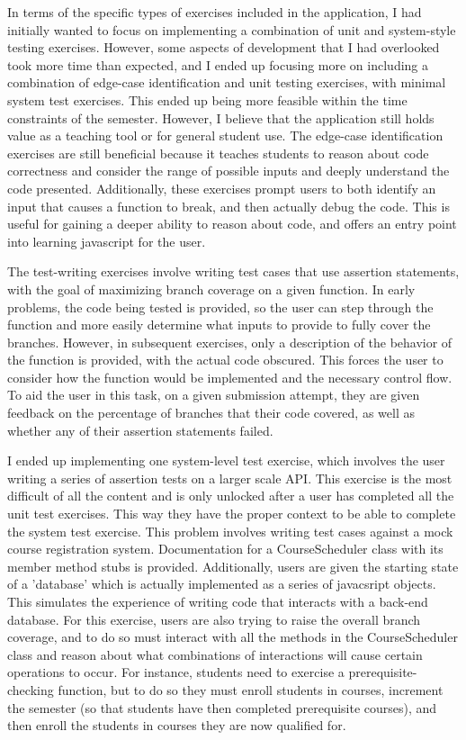 \documentclass[10pt,twocolumn]{article}
\begin{document}
In terms of the specific types of exercises included in the application, I had initially wanted to focus on implementing 
a combination of unit and system-style testing exercises. However, some aspects of development that I had overlooked took 
more time than expected, and I ended up focusing more on including a combination of edge-case identification and unit testing 
exercises, with minimal system test exercises. This ended up being more feasible within the time constraints of the semester. 
However, I believe that the application still holds value as a teaching tool or for general student use. The edge-case 
identification exercises are still beneficial because it teaches students to reason about code correctness and consider 
the range of possible inputs and deeply understand the code presented. Additionally, these exercises prompt users to both 
identify an input that causes a function to break, and then actually debug the code. This is useful for gaining a deeper 
ability to reason about code, and offers an entry point into learning javascript for the user. 

The test-writing exercises involve writing test cases that use assertion statements, with the goal of maximizing branch 
coverage on a given function. In early problems, the code being tested is provided, so the user can step 
through the function and more easily determine what inputs to provide to fully cover the branches. However, in subsequent 
exercises, only a description of the behavior of the function is provided, with the actual code obscured. This forces the 
user to consider how the function would be implemented and the necessary control flow. To aid the user in this 
task, on a given submission attempt, they are given feedback on the percentage of branches that their code covered, as 
well as whether any of their assertion statements failed.

I ended up implementing one system-level test exercise, which involves the user writing a series of assertion tests on a
larger scale API. This exercise is the most difficult of all the content and is only unlocked after a user has completed 
all the unit test exercises. This way they have the proper context to be able to complete the system test exercise. This
problem involves writing test cases against a mock course registration system. Documentation 
for a CourseScheduler class with its member method stubs is provided. Additionally, users are given the starting state of a 'database' 
which is actually implemented as a series of javacsript objects. This simulates the experience of writing code 
that interacts with a back-end database. For this exercise, users are also trying to raise the overall branch coverage, 
and to do so must interact with all the methods in the CourseScheduler class and reason about what combinations of 
interactions will cause certain operations to occur. For instance, students need to exercise a prerequisite-checking function,
but to do so they must enroll students in courses, increment the semester (so that students have then completed prerequisite 
courses), and then enroll the students in courses they are now qualified for. 
\end{document}
